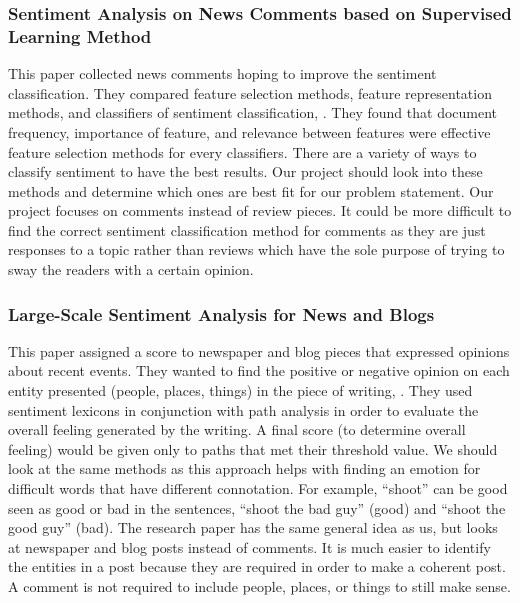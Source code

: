 \documentclass[letterpaper]{article}
\begin{document}
\subsubsection{Sentiment Analysis on News Comments based on Supervised Learning Method}
This paper collected news comments hoping to improve the sentiment classification. They compared feature selection methods, feature representation methods, and classifiers of sentiment classification, \cite{SentimentAnalysis}. They found that document frequency, importance of feature, and relevance between features were effective feature selection methods for every classifiers. 
There are a variety of ways to classify sentiment to have the best results. Our project should look into these methods and determine which ones are best fit for our problem statement.
Our project focuses on comments instead of review pieces. It could be more difficult to find the correct sentiment classification method for comments as they are just responses to a topic rather than reviews which have the sole purpose of trying to sway the readers with a certain opinion.

\subsubsection{Large-Scale Sentiment Analysis for News and Blogs}

This paper assigned a score to newspaper and blog pieces that expressed opinions about recent events. They wanted to find the positive or negative opinion on each entity presented (people, places, things)  in the piece of writing, \cite{LargeScaleSentiment}. They used sentiment lexicons in conjunction with path analysis in order to evaluate the overall feeling generated by the writing. A final score (to determine overall feeling) would be given only to paths that met their threshold value.
We should look at the same methods as this approach helps with finding an emotion for difficult words that have different connotation. For example, “shoot” can be good seen as good or bad in the sentences, “shoot the bad guy” (good) and “shoot the good guy” (bad).
The research paper has the same general idea as us, but looks at newspaper and blog posts instead of comments. It is much easier to identify the entities in a post because they are required in order to make a coherent post. A comment is not required to include people, places, or things to still make sense.

\end{document}
